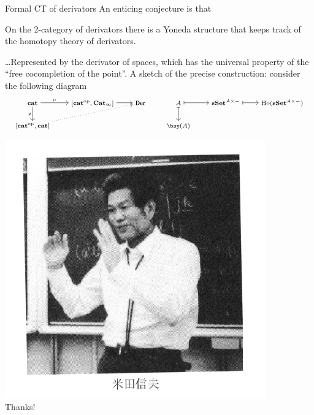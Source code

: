 \documentclass{beamer}
\begin{document}
\begin{frame}{Formal CT of derivators}
	An enticing conjecture is that
	\begin{block}{}
		On the 2-category of \alert{derivators} there is a Yoneda structure that keeps track of the homotopy theory of derivators.
	\end{block}
	\dots Represented by the derivator of spaces, which has the universal property of the ``free cocompletion of the point''. \onslide<3-> A sketch of the precise construction: consider the following diagram
	\[\scriptsize\begin{tikzcd}[ampersand replacement=\&]
			\caat \arrow[r, "\nu"] \arrow[d, "y"'] \& {[\caat^\op,{\bf Cat}_\infty]} \arrow[r] \& \textbf{Der} \& A \arrow[r, maps to] \arrow[d, maps to] \& {\bf sSet}^{A\times-} \arrow[r, maps to] \& \text{Ho}({\bf sSet}^{A\times-}) \\
			{[\caat^\op,\caat]} \arrow[rru, dotted] \&  \&  \& \bsy(A) \&  \&
		\end{tikzcd}\]
	\onslide<4->
\end{frame}
\begin{frame}
	\centering\includegraphics[width=.4\textwidth]{yoneda.png}\\
	\Huge Thanks!
\end{frame}
\end{document}
